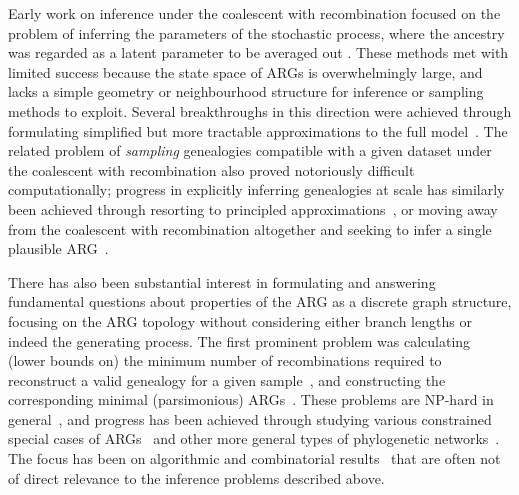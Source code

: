 \documentclass{article}
\begin{document}
Early work on inference under the coalescent with recombination
focused on the problem of
inferring the parameters of the
stochastic process, where the ancestry was regarded as a
latent parameter to be averaged out
\citep[e.g.][]{griffiths1996ancestral,kuhner2000maximum, nielsen2000estimation,
fearnhead2001estimating}.
These methods met with limited success
because the state space of ARGs is overwhelmingly large, and
lacks a simple geometry or neighbourhood structure for inference or
sampling methods to  exploit.
Several breakthroughs in this direction were achieved through
formulating simplified but more tractable approximations to the full
model~\citep{mcvean2005approximating,marjoram2006fast,li2011inference,
paul2011accurate,schiffels2014inferring}.
The related problem of \emph{sampling} genealogies compatible with a given
dataset under the coalescent with recombination also proved notoriously difficult
computationally; progress in explicitly inferring genealogies at scale
has similarly been achieved through resorting to principled
approximations~\citep{rasmussen2014genome,mahmoudi2022bayesian},
or moving away from the coalescent with recombination altogether and seeking
to infer a single plausible ARG~\citep[e.g.][]{
minichiello2006mapping,kelleher2019inferring,speidel2019method}.

There has also been substantial interest in formulating and answering
fundamental questions about properties
of the ARG as a discrete graph structure, focusing on the ARG topology without considering
either branch lengths or indeed the generating process.
The first prominent problem was calculating (lower bounds on) the minimum number of
recombinations required to reconstruct a valid genealogy for a given
sample~\citep{myers2003bounds}, and constructing the corresponding
minimal (parsimonious)
ARGs~\citep{song2003parsimonious,song2005efficient,lyngso2005minimum}.
These problems are NP-hard in general~\citep{wang2001perfect}, and progress has
been achieved through studying various constrained special cases of ARGs~\citep[e.g.][]{gusfield2004optimal} and
other more general types of phylogenetic networks~\citep{huson2010phylogenetic}. The
focus has been on algorithmic and combinatorial results~\citep{gusfield2014recombinatorics}
that are often not of
direct relevance to the inference problems described above.

\end{document}
